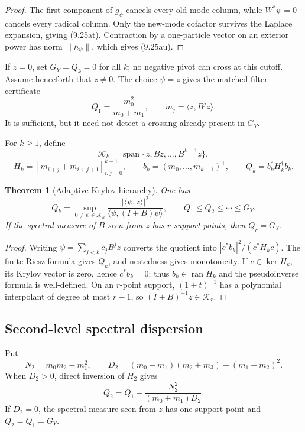 \documentclass[11pt]{amsart}
\newtheorem{theorem}{Theorem}[section]
\theoremstyle{definition}
\theoremstyle{remark}
\begin{document}
\begin{proof}
The first component of \(g_\psi\) cancels every old-mode column, while
\(W^*\psi=0\) cancels every radical column.  Only the new-mode cofactor
survives the Laplace expansion, giving (9.25at).  Contraction by a
one-particle vector on an exterior power has norm \(\|h_\psi\|\), which
gives (9.25au).
\end{proof}

If \(z=0\), set \(G_Y=Q_k=0\) for all \(k\); no negative pivot can
cross at this cutoff.  Assume henceforth that \(z\ne0\).  The choice
\(\psi=z\) gives the matched-filter certificate
\[
 Q_1=\frac{m_0^2}{m_0+m_1},
 \qquad m_j=\langle z,B^jz\rangle .
\tag{9.25av}
\]
It is sufficient, but it need not detect a crossing already present in
\(G_Y\).

For \(k\ge1\), define
\[
 \mathcal K_k=\operatorname{span}\{z,Bz,\ldots,B^{k-1}z\},
\]
\[
 H_k=[m_{i+j}+m_{i+j+1}]_{i,j=0}^{k-1},\qquad
 b_k=(m_0,\ldots,m_{k-1})^{\mathsf T},\qquad
 Q_k=b_k^*H_k^\dagger b_k .
\tag{9.25aw}
\]

\begin{theorem}[Adaptive Krylov hierarchy]
\label{thm:adaptive-krylov}
One has
\[
 \boxed{
 Q_k=\sup_{0\ne\psi\in\mathcal K_k}
 \frac{|\langle\psi,z\rangle|^2}
  {\langle\psi,(I+B)\psi\rangle},
 \qquad
 Q_1\le Q_2\le\cdots\le G_Y.}
\tag{9.25ax}
\]
If the spectral measure of \(B\) seen from \(z\) has \(r\) support
points, then \(Q_r=G_Y\).
\end{theorem}

\begin{proof}
Writing \(\psi=\sum_{j<k}c_jB^jz\) converts the quotient into
\(|c^*b_k|^2/(c^*H_kc)\).  The finite Riesz formula gives \(Q_k\), and
nestedness gives monotonicity.  If \(c\in\ker H_k\), its Krylov vector is
zero, hence \(c^*b_k=0\); thus \(b_k\in\operatorname{ran}H_k\) and the
pseudoinverse formula is well-defined.  On an \(r\)-point support,
\((1+t)^{-1}\) has a polynomial interpolant of degree at most \(r-1\),
so \((I+B)^{-1}z\in\mathcal K_r\).
\end{proof}

\subsection{Second-level spectral dispersion}
\label{sec:q2-dispersion}

Put
\[
 N_2=m_0m_2-m_1^2,\qquad
 D_2=(m_0+m_1)(m_2+m_3)-(m_1+m_2)^2 .
\tag{9.25ay}
\]
When \(D_2>0\), direct inversion of \(H_2\) gives
\[
 \boxed{
 Q_2=Q_1+\frac{N_2^2}{(m_0+m_1)D_2}.}
\tag{9.25az}
\]
If \(D_2=0\), the spectral measure seen from \(z\) has one support point
and \(Q_2=Q_1=G_Y\).
\end{document}
